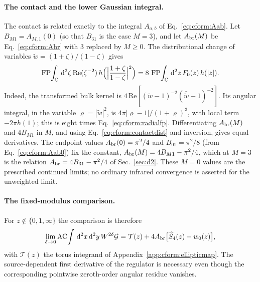 \documentclass[11pt,a4paper]{article}
\numberwithin{equation}{section}
\newcommand{\dd}{\,\mathrm d}
\newcommand{\AC}{\operatorname{AC}}
\newcommand{\FP}{\operatorname{FP}}
\begin{document}
\paragraph{The contact and the lower Gaussian integral.} The contact is related exactly to the integral
$A_{a,b}$ of Eq.~\eqref{eq:cform:Aab}. Let $B_{M1}=A_{M,1}(0)$ (so that $B_{31}$ is the case $M=3$), and let
$A_{\rm br}(M)$ be Eq.~\eqref{eq:cform:Abr} with
3 replaced by $M\ge0$. The distributional change of variables $\tilde w=(1+\zeta)/(1-\zeta)$ gives
\begin{equation}
 \FP\!\int_{\mathbb C}\dd^2\zeta\,\mathrm{Re}(\zeta^{-2})\,h\Bigl(\Bigl|\frac{1+\zeta}{1-\zeta}\Bigr|^2\Bigr)
 =8\,\FP\!\int_{\mathbb C}\dd^2z\,F_0(z)\,h(|z|).
 \label{eq:cform:contactdist}
\end{equation}
Indeed, the transformed bulk kernel is $4\,\mathrm{Re}[(\tilde w-1)^{-2}(\bar{\tilde w}+1)^{-2}]$. Its angular
integral, in the variable $\varrho=|\tilde w|^2$, is $4\pi|\varrho-1|/(1+\varrho)^3$, with local term $-2\pi h(1)$; this
is eight times Eq.~\eqref{eq:cform:radialfp}. Differentiating $A_{\rm br}(M)$ and $4B_{M1}$ in $M$, and using
Eq.~\eqref{eq:cform:contactdist} and inversion, gives equal derivatives. The endpoint values $A_{\rm br}(0)=\pi^2/4$
and $B_{01}=\pi^2/8$ (from Eq.~\eqref{eq:cform:Aab0}) fix the constant, $A_{\rm br}(M)=4B_{M1}-\pi^2/4$, which at $M=3$ is
the relation $A_{\rm br}=4B_{31}-\pi^2/4$ of Sec.~\ref{sec:d2}. These $M=0$ values are the prescribed continued limits;
no ordinary infrared convergence is asserted for the unweighted limit.

\paragraph{The fixed-modulus comparison.} For $z\notin\{0,1,\infty\}$ the comparison is therefore
\begin{equation}
 \lim_{\delta\to0}\AC\!\int\dd^2x\dd^2y\,W^{2\delta}\mathcal G=\mathcal T(z)+4A_{\rm br}\bigl[\widehat S_4(z)-w_0(z)\bigr],
 \label{eq:cform:fixedmod}
\end{equation}
with $\mathcal T(z)$ the torus integrand of Appendix~\ref{app:cform:ellipticmap}. The source-dependent first derivative
of the regulator is necessary even though the corresponding pointwise zeroth-order angular residue vanishes.
\end{document}
